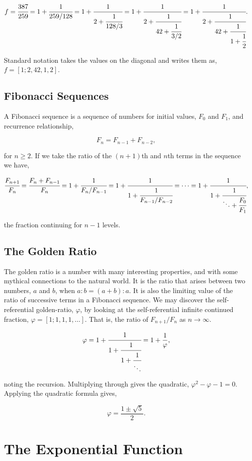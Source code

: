 \documentclass[11pt]{amsart}
\begin{document}
$$
f = \cfrac{387}{259}
= 1 + \cfrac{1}{259/128}
= 1 + \cfrac{1}{2 + \cfrac{1}{128/3}} 
= 1 + \cfrac{1}{2 + \cfrac{1}{42 + \cfrac{1}{3/2}}} 
= 1 + \cfrac{1}{2 + \cfrac{1}{42 + \cfrac{1}{1 + \cfrac{1}{2}}}}.
$$

Standard notation takes the values on the diagonal and writes them as, $f = [1; 2, 42, 1, 2]$.

\subsection{Fibonacci Sequences}

A Fibonacci sequence is a sequence of numbers for initial values, $F_0$ and $F_1$, and recurrence relationship,

$$F_n = F_{n-1} + F_{n-2},$$

for $n \geq 2$. If we take the ratio of the $(n+1)$th and $n$th terms in the sequence we have,

$$
\cfrac{F_{n+1}}{F_n}
= \cfrac{F_n + F_{n - 1}}{F_n}
= 1 + \cfrac{1}{F_{n}/F_{n - 1}}
= 1 + \cfrac{1}{1 + \cfrac{1}{F_{n-1}/F_{n - 2}}}
= \cdots
= 1 + \cfrac{1}{1 + \cfrac{1}{\ddots + \cfrac{F_0}{F_1}}},
$$

the fraction continuing for $n - 1$ levels.

\subsection{The Golden Ratio}

The golden ratio is a number with many interesting properties, and with some mythical connections to the natural world. It is the ratio that arises between two numbers, $a$ and $b$, when $a : b = (a + b) : a$. It is also the limiting value of the ratio of successive terms in a Fibonacci sequence. We may discover the self-referential golden-ratio, $\varphi$, by looking at the self-referential infinite continued fraction, $\varphi = [1; 1, 1, 1, \dots]$. That is, the ratio of $F_{n+1}/F_n$ as $n \to \infty$.

$$
\varphi = 1 + \cfrac{1}{1 + \cfrac{1}{1 + \cfrac{1}{\ddots}}} = 1 + \frac{1}{\varphi},
$$

noting the recursion. Multiplying through gives the quadratic, $\varphi^2 - \varphi - 1 = 0$. Applying the quadratic formula gives,

$$\varphi = \frac{1 \pm \sqrt{5}}{2}.$$

\section{The Exponential Function}
\end{document}
